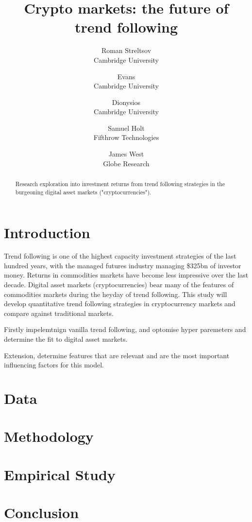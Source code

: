 \documentclass[11pt,a4paper,english]{article}
\title{Crypto markets: the future of trend following}
\author{%
    Roman Streltsov \\
    \small Cambridge University\\
    \and
    Evans \\
    \small Cambridge University\\
    \and
    Dionysios \\
    \small Cambridge University\\
    \and
    Samuel Holt \\
    \small Fifthrow Technologies\\
    \and
    James West\\
    \small Globe Research\\
}
\begin{document}
    \maketitle

    \begin{abstract}
    Research exploration into investment returns from trend following strategies in the burgeoning digital asset markets ("cryptocurrencies").
    \end{abstract}
    \newpage

    \tableofcontents\newpage
    \section{Introduction}
    Trend following is one of the highest capacity investment strategies of the last hundred years, with the managed futures industry managing \$325bn of investor money.
    Returns in commodities markets have become less impressive over the last decade.
    Digital asset markets (cryptocurrencies) bear many of the features of commodities markets during the heyday of trend following.
    This study will develop quantitative trend following strategies in cryptocurrency markets and compare against traditional markets.
    
    Firstly impelemtnign vanilla trend following, and optomise hyper paremeters and determine the fit to digital asset markets.

    Extension, determine features that are relevant and are the most important influencing factors for this model.
    \section{Data}
    \section{Methodology}
    \section{Empirical Study}
    \section{Conclusion}
\end{document}
